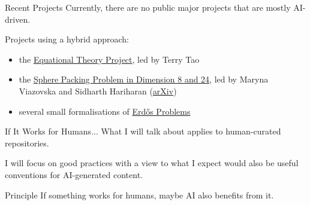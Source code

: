 \documentclass{beamer}
\begin{document}
\begin{frame}{Recent Projects}
Currently, there are no public major projects that are mostly AI-driven.

\bigskip

Projects using a hybrid approach:

\medskip

\begin{itemize}
  \item the \href{https://terrytao.wordpress.com/2023/03/}{Equational Theory Project}, led by Terry Tao
  \medskip
  \item the \href{https://github.com/thefundamentaltheor3m/Sphere-Packing-Lean}{Sphere Packing Problem in Dimension 8 and 24}, led by Maryna Viazovska and Sidharth Hariharan (\href{https://arxiv.org/abs/2402.06490}{arXiv})
  \medskip
  \item several small formalisations of \href{https://www.erdosproblems.com/}{Erd\H{o}s Problems}
\end{itemize}
\end{frame}

\begin{frame}{If It Works for Humans...}
What I will talk about applies to human-curated repositories.

\bigskip

I will focus on good practices with a view to what I expect would also be useful conventions for AI-generated content.

\bigskip

\begin{block}{Principle}
If something works for humans, maybe AI also benefits from it.
\end{block}
\end{frame}
\end{document}
